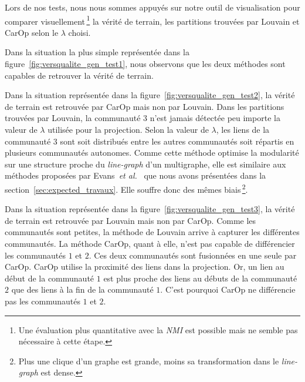 Lors de nos tests,  nous nous sommes appuyés sur notre outil de visualisation pour comparer visuellement\,\footnote{Une évaluation plus quantitative avec la \emph{NMI} est possible mais ne semble pas nécessaire à cette étape.} la vérité de terrain, les partitions trouvées par Louvain et CarOp selon le $\lambda$ choisi.

\bigskip

Dans la situation la plus simple représentée dans la figure~\ref{fig:versqualite_gen_test1}, nous observons que les deux méthodes sont capables de retrouver la vérité de terrain.

Dans la situation représentée dans la figure~\ref{fig:versqualite_gen_test2}, la vérité de terrain est retrouvée par CarOp mais non par Louvain.
Dans les partitions trouvées par Louvain, la communauté $3$ n'est jamais détectée peu importe la valeur de $\lambda$ utilisée pour la projection.
Selon la valeur de $\lambda$, les liens de la communauté $3$ sont soit distribués entre les autres communautés soit répartis en plusieurs communautés autonomes.
Comme cette méthode optimise la modularité sur une structure proche du \emph{line-graph} d'un multigraphe, elle est similaire aux méthodes proposées par Evans~\emph{et al.}~\cite{Evans2009} que nous avons présentées dans la section~\ref{sec:expected_travaux}.
Elle souffre donc des mêmes biais\,\footnote{Plus une clique d'un graphe est grande, moins sa transformation dans le \emph{line-graph} est dense.}.

Dans la situation représentée dans la figure~\ref{fig:versqualite_gen_test3}, la vérité de terrain est retrouvée par Louvain mais non par CarOp.
Comme les communautés sont petites, la méthode de Louvain arrive à capturer les différentes communautés.
La méthode CarOp, quant à elle, n'est pas capable de différencier les communautés $1$ et $2$.
Ces deux communautés sont fusionnées en une seule par CarOp.
CarOp utilise la proximité des liens dans la projection.
Or, un lien au début de la communauté $1$ est plus proche des liens au débuts de la communauté $2$ que des liens à la fin de la communauté $1$.
C'est pourquoi CarOp ne différencie pas les communautés $1$ et $2$.




